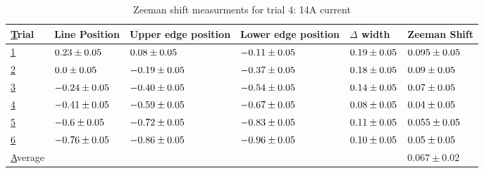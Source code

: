 \begin{table}
    \begin{adjustwidth}{-100pt}{-100pt}
        \centering
        \begin{tabular}{|l|l|l|l|l|l|}
            \hline
            {\ul Trial}   & Line Position                & Upper edge position          & Lower edge position          & $\Delta$ width              & Zeeman Shift                 \\ \hline
            {\ul 1}       & $0.23 \pm 0.05$  & $0.08 \pm 0.05$  & $-0.11 \pm 0.05$ & $0.19 \pm 0.05$ & $0.095 \pm 0.05$ \\ \hline
            {\ul 2}       & $0.0 \pm 0.05$   & $-0.19 \pm 0.05$ & $-0.37 \pm 0.05$ & $0.18 \pm 0.05$ & $0.09 \pm 0.05$  \\ \hline
            {\ul 3}       & $-0.24 \pm 0.05$ & $-0.40 \pm 0.05$ & $-0.54 \pm 0.05$ & $0.14 \pm 0.05$ & $0.07 \pm 0.05$  \\ \hline
            {\ul 4}       & $-0.41 \pm 0.05$ & $-0.59 \pm 0.05$ & $-0.67 \pm 0.05$ & $0.08 \pm 0.05$ & $0.04 \pm 0.05$  \\ \hline
            {\ul 5}       & $-0.6 \pm 0.05$  & $-0.72 \pm 0.05$ & $-0.83 \pm 0.05$ & $0.11 \pm 0.05$ & $0.055 \pm 0.05$ \\ \hline
            {\ul 6}       & $-0.76 \pm 0.05$ & $-0.86 \pm 0.05$ & $-0.96 \pm 0.05$ & $0.10 \pm 0.05$ & $0.05 \pm 0.05$  \\ \hline
            {\ul Average} &                              &                              &                              &                             & $0.067 \pm 0.02$             \\ \hline
        \end{tabular}
    \end{adjustwidth}

    \caption{Zeeman shift measurments for trial 4: 14A current}

\end{table}



